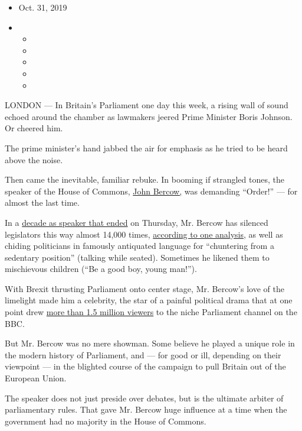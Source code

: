 \begin{itemize}
\item
  Oct. 31, 2019
\item
  \begin{itemize}
  \item
  \item
  \item
  \item
  \item
  \end{itemize}
\end{itemize}

LONDON --- In Britain's Parliament one day this week, a rising wall of
sound echoed around the chamber as lawmakers jeered Prime Minister Boris
Johnson. Or cheered him.

The prime minister's hand jabbed the air for emphasis as he tried to be
heard above the noise.

Then came the inevitable, familiar rebuke. In booming if strangled
tones, the speaker of the House of Commons,
\href{https://www.nytimes.com/2019/01/19/world/europe/brexit-speaker-john-bercow.html}{John
Bercow,} was demanding ``Order!'' --- for almost the last time.

In a
\href{https://www.nytimes.com/2019/10/20/world/europe/speaker-parliament-john-bercow.html}{decade
as speaker that ended} on Thursday, Mr. Bercow has silenced legislators
this way almost 14,000 times,
\href{https://www.bbc.co.uk/news/uk-politics-50237401}{according to one
analysis}, as well as chiding politicians in famously antiquated
language for ``chuntering from a sedentary position'' (talking while
seated). Sometimes he likened them to mischievous children (``Be a good
boy, young man!'').

With Brexit thrusting Parliament onto center stage, Mr. Bercow's love of
the limelight made him a celebrity, the star of a painful political
drama that at one point drew
\href{https://www.radiotimes.com/news/tv/2019-09-04/bbc-parliament-hits-all-time-rating-high-with-boris-johnsons-brexit-defeat/}{more
than 1.5 million viewers} to the niche Parliament channel on the BBC.

But Mr. Bercow was no mere showman. Some believe he played a unique role
in the modern history of Parliament, and --- for good or ill, depending
on their viewpoint --- in the blighted course of the campaign to pull
Britain out of the European Union.

The speaker does not just preside over debates, but is the ultimate
arbiter of parliamentary rules. That gave Mr. Bercow huge influence at a
time when the government had no majority in the House of Commons.

